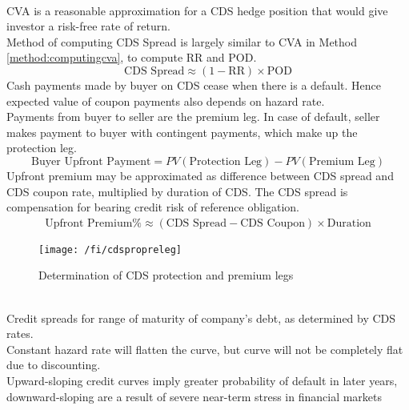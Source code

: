 \begin{remark} \\
CVA is a reasonable approximation for a CDS hedge position that would give investor a risk-free rate of return.\\
Method of computing CDS Spread is largely similar to CVA in Method \ref{method:computingcva}, to compute RR and POD.
\begin{equation}
\text{CDS Spread} \approx (1-\text{RR}) \times \text{POD} \nonumber
\end{equation}
Cash payments made by buyer on CDS cease when there is a default. Hence expected value of coupon payments also depends on hazard rate.\\
Payments from buyer to seller are the premium leg. In case of default, seller makes payment to buyer with contingent payments, which make up the protection leg.
\begin{equation}
\text{Buyer Upfront Payment} = PV(\text{Protection Leg}) - PV(\text{Premium Leg}) \nonumber
\end{equation}
Upfront premium may be approximated as difference between CDS spread and CDS coupon rate, multiplied by duration of CDS. The CDS spread is compensation for bearing credit risk of reference obligation.
\begin{align}
\text{Upfront Premium}\% \approx (\text{CDS Spread} - \text{CDS Coupon}) \times \text{Duration} \nonumber
\end{align}
\end{remark}

\begin{figure}[H]
\centering
\texttt{[image: /fi/cdspropreleg]}
\caption{Determination of CDS protection and premium legs}
\end{figure}

\begin{definition} \\
Credit spreads for range of maturity of company's debt, as determined by CDS rates.\\
Constant hazard rate will flatten the curve, but curve will not be completely flat due to discounting.\\
Upward-sloping credit curves imply greater probability of default in later years, downward-sloping are a result of severe near-term stress in financial markets
\end{definition}

